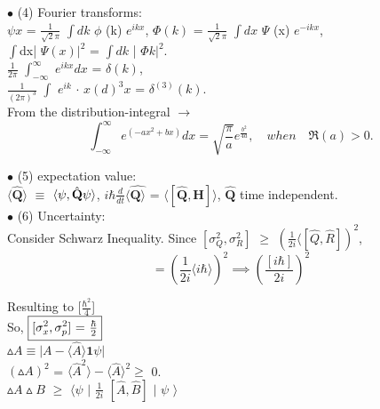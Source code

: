 \documentclass[a4paper, 10pt, onepage]{elegantbook}
\begin{document}
{$\bullet$ (4) Fourier transforms:\\
$\psi x$ = $\frac{1}{\sqrt2 \pi}$ $\int{dk}$ $\phi$ (k) $e^{ikx}$, $\Phi (k)$ = $\frac{1}{\sqrt2\pi}$ $\int{dx}$ $\Psi$ (x) $e^{-ikx}$, \\
$\int${dx}| $\Psi (x) |^2$ = $\int {dk}$ | $\Phi k |^2$. \\
$\frac{1}{2\pi}$ $\int_ {-\infty}^{\infty}$ $e^{ikx}{dx}$ = $\delta(k)$, \\
$\frac{1}{(2\pi)^3}$ $\int$ $e^{ik}$ $\cdot$ ${x}(d)^3{x}$ = $\delta^{(3)}(k)$.  \\
  
From the distribution-integral $\rightarrow$
\begin{equation}
\int_{-\infty}^{\infty} e^{(-ax^2 + bx)} dx = \sqrt{ \frac{\pi}{a}} e^{\frac{b^2}{4a}}, \quad when \quad \Re{(a)} > 0.
\end{equation}

$\bullet$ (5) expectation value:  \\
$\langle\hat{\mathbf Q} \rangle$ $\equiv$ $\langle\psi,  \\
\hat{\mathbf Q}\psi \rangle$, $i \hbar \frac{d}{dt} \langle \hat{\mathbf Q \rangle}$ = $\langle[ \hat{\mathbf Q},{\mathbf H}] \rangle$,
$\hat{\mathbf Q}$ time independent.  \\

$\bullet$ (6) Uncertainty:  \\

Consider Schwarz Inequality. Since $[\sigma^2_Q, \sigma^2_R]$ $\geq$ $(\frac{1}{2i} \langle [\hat{Q}, \hat{R}])^2$,
\begin{equation}
[\sigma^2_x, \sigma^2_p] = (\frac{1}{2i} \langle i \hbar \rangle)^2 \implies (\frac{[i \hbar]}{2i})^2
\end{equation}

 Resulting to [$\frac{\hbar^2}{4}$] \\

So, $\boxed{[\sigma^2_x, \sigma^2_p$] = $\frac{\hbar}{2}}$  \\

$\vartriangle{A} \equiv \vert {A} - \langle \hat{A} \rangle \mathbf{1} \psi \vert$  \\

$(\vartriangle{A})^2$ = $\langle \hat{A}^2 \rangle - \langle \hat{A} \rangle^2 \geq$ 0.  \\

$\vartriangle{A} \vartriangle{B}$ $\geq$ $\langle \psi$ \quad $\mid$ $\frac{1}{2i}$ $[\hat{A},\hat{B}]$ \quad $\mid$ $\psi$ $\rangle$  \\

}
\end{document}
